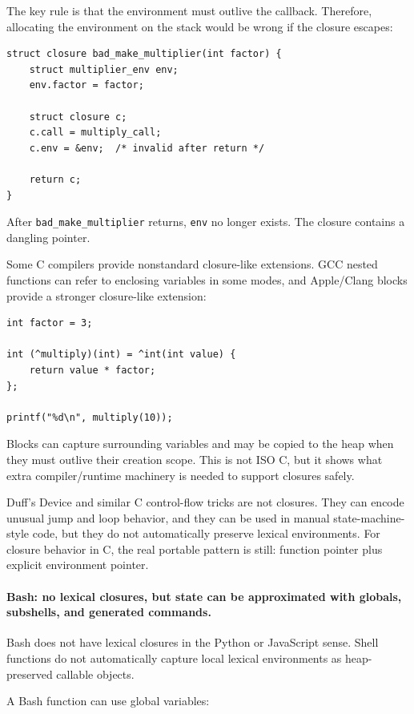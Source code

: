 The key rule is that the environment must outlive the callback. Therefore, allocating the environment on the stack would be wrong if the closure escapes:

\begin{verbatim}
struct closure bad_make_multiplier(int factor) {
    struct multiplier_env env;
    env.factor = factor;

    struct closure c;
    c.call = multiply_call;
    c.env = &env;  /* invalid after return */

    return c;
}
\end{verbatim}

After \texttt{bad\_make\_multiplier} returns, \texttt{env} no longer exists. The closure contains a dangling pointer.

Some C compilers provide nonstandard closure-like extensions. GCC nested functions can refer to enclosing variables in some modes, and Apple/Clang blocks provide a stronger closure-like extension:

\begin{verbatim}
int factor = 3;

int (^multiply)(int) = ^int(int value) {
    return value * factor;
};

printf("%d\n", multiply(10));
\end{verbatim}

Blocks can capture surrounding variables and may be copied to the heap when they must outlive their creation scope. This is not ISO C, but it shows what extra compiler/runtime machinery is needed to support closures safely.

Duff's Device and similar C control-flow tricks are not closures. They can encode unusual jump and loop behavior, and they can be used in manual state-machine-style code, but they do not automatically preserve lexical environments. For closure behavior in C, the real portable pattern is still: function pointer plus explicit environment pointer.

\paragraph{Bash: no lexical closures, but state can be approximated with globals, subshells, and generated commands.}

Bash does not have lexical closures in the Python or JavaScript sense. Shell functions do not automatically capture local lexical environments as heap-preserved callable objects.

A Bash function can use global variables:

